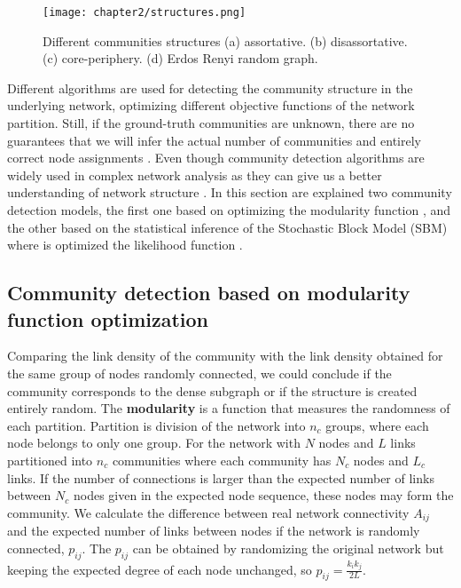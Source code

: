 \begin{figure}[h]
	\centering
	\texttt{[image: chapter2/structures.png]}
	\caption[Stochastic Block Model]{ Different communities structures  (a) assortative. (b) disassortative. (c) core-periphery. (d) Erdos Renyi random graph.}
	\label{fig:SBM}
\end{figure}

Different algorithms are used for detecting the community structure in the underlying network, optimizing different objective functions of the network partition. Still, if the ground-truth communities are unknown, there are no guarantees that we will infer the actual number of communities and entirely correct node assignments \cite{peel2017ground}. Even though community detection algorithms are widely used in complex network analysis as they can give us a better understanding of network structure \cite{peel2017ground, cherifi2019community}.  %
In this section are explained two community detection models, the first one based on optimizing the modularity function \cite{fortunato2010community, guimera2004modularity}, and the other based on the statistical inference of the Stochastic Block Model (SBM) where is optimized the likelihood function \cite{fortunato2010community, lee2019review, peixoto2019bayesian}. %

\subsection{Community detection based on modularity function optimization} 

Comparing the link density of the community with the link density obtained for the same group of nodes randomly connected, we could conclude if the community corresponds to the dense subgraph or if the structure is created entirely random. The \textbf{modularity} \cite{newman2004finding, guimera2004modularity, good2010performance} is a function that measures the randomness of each partition. %
Partition is division of the network into $n_c$ groups, where each node belongs to only one group. 
For the network with $N$ nodes and $L$ links partitioned into $n_c$ communities where each community has $N_c$ nodes and $L_c$ links. If the number of connections is larger than the expected number of links between $N_c$ nodes given in the expected node sequence, these nodes may form the community. We calculate the difference between real network connectivity $A_{ij}$ and the expected number of links between nodes if the network is randomly connected, $p_{ij}$. The $p_{ij}$ can be obtained by randomizing the original network but keeping the expected degree of each node unchanged, so $p_{ij}= \frac{k_ik_j}{2L}$.

